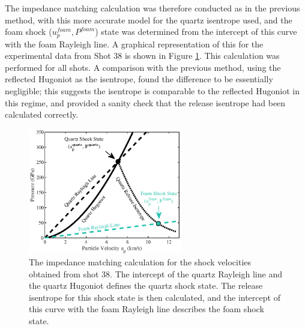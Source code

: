 The impedance matching calculation was therefore conducted as in the previous method, with this more accurate model for the quartz isentrope used, and the foam shock ($u_p^{foam}, P^{foam}$) state was determined from the intercept of this curve with the foam Rayleigh line. A graphical representation of this for the experimental data from Shot 38 is shown in Figure \ref{fig:Impedance Match}. This calculation was performed for all shots. A comparison with the previous method, using the reflected Hugoniot as the isentrope, found the difference to be essentially negligible; this suggests the isentrope is comparable to the reflected Hugoniot in this regime, and provided a sanity check that the release isentrope had been calculated correctly.


\begin{figure} [h]
\begin{centering}
\includegraphics[width=0.6\textwidth]{figures/Experiment/ImpedanceMatch.eps}%
\caption{\label{fig:Impedance Match} The impedance matching calculation for the shock velocities obtained from shot 38. The intercept of the quartz Rayleigh line and the quartz Hugoniot defines the quartz shock state. The release isentrope for this shock state is then calculated, and the intercept of this curve with the foam Rayleigh line describes the foam shock state.}
\end{centering}
\end{figure}

